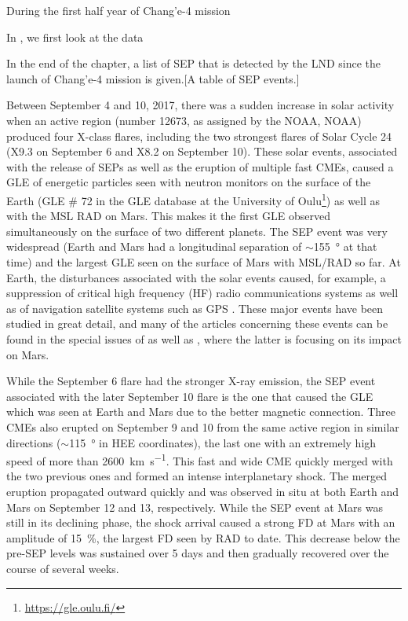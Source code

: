 During the first half year of Chang'e-4 mission

In \citet{Xu-2020-LND-SEP}, we first look at the data 

In the end of the chapter, a list of SEP that is detected by the LND since the launch of Chang'e-4 mission is given.[A table of SEP events.]


Between September 4 and 10, 2017, there was a sudden increase in solar activity when an active region (number 12673, as assigned by the \acl{NOAA}, \acs{NOAA}) produced four X-class flares, including the two strongest flares of Solar Cycle 24 (X9.3 on September 6 and X8.2 on September 10).
These solar events, associated with the release of \acp{SEP} as well as the eruption of multiple fast \acp{CME}, caused a \ac{GLE} of energetic particles seen with neutron monitors on the surface of the Earth (\ac{GLE} \# 72 in the \ac{GLE} database at the University of Oulu\footnote{\url{https://gle.oulu.fi/}}) as well as with the \ac{MSL} \ac{RAD} on Mars. This makes it the first \ac{GLE} observed simultaneously on the surface of two different planets.
The \ac{SEP} event was very widespread (Earth and Mars had a longitudinal separation of $\sim$\SI{155}{\degree} at that time) and the largest \ac{GLE} seen on the surface of Mars with \ac{MSL}/\ac{RAD} so far. At Earth, the disturbances associated with the solar events caused, for example, a suppression of critical high frequency (HF) radio communications systems \citep{Frissell-2018,Bland-2018} as well as of navigation satellite systems such as GPS \citep{Berdermann-2018,Sato-2019}.
These major events have been studied in great detail, and many of the articles concerning these events can be found in the special issues of \citet{SpaceWeather-2018-special-issue-September-event} as well as \citet{GRL-2018-special-issue-September-event}, where the latter is focusing on its impact on Mars.

While the September 6 flare had the stronger X-ray emission, the \ac{SEP} event associated with the later September 10 flare is the one that caused the \ac{GLE} which was seen at Earth and Mars due to the better magnetic connection. Three \acp{CME} also erupted on September 9 and 10 from the same active region in similar directions ($\sim$\SI{115}{\degree} in \ac{HEE} coordinates), the last one with an extremely high speed of more than \SI{2600}{\kilo\meter\per\second}. This fast and wide \ac{CME} quickly merged with the two previous ones and formed an intense interplanetary shock. The merged eruption propagated outward quickly and was observed in situ at both Earth and Mars on September 12 and 13, respectively. While the \ac{SEP} event at Mars was still in its declining phase, the shock arrival caused a strong \ac{FD} at Mars with an amplitude of \SI{15}{\percent}, the largest \ac{FD} seen by \ac{RAD} to date. This decrease below the pre-\ac{SEP} levels was sustained over 5 days and then gradually recovered over the course of several weeks.

